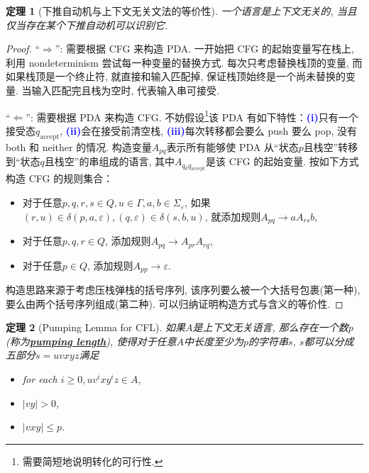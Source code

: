 \documentclass[8pt]{article}
\theoremstyle{compact}
\newtheorem{theorem}{定理}
\def\obj#1{\textbf{\uline{#1}}}
\def\num#1{\textnormal{\textbf{\mbox{\textcolor{blue}{(#1)}}}}}
\def\le{\leqslant}
\def\ge{\geqslant}
\begin{document}
\begin{theorem}[下推自动机与上下文无关文法的等价性]
	一个语言是上下文无关的, 当且仅当存在某个下推自动机可以识别它. 
\end{theorem}
\begin{proof}
	“$\Rightarrow$”: 需要根据 CFG 来构造 PDA. 一开始把 CFG 的起始变量写在栈上, 利用 nondeterminism 尝试每一种变量的替换方式. 每次只考虑替换栈顶的变量, 而如果栈顶是一个终止符, 就直接和输入匹配掉, 保证栈顶始终是一个尚未替换的变量. 当输入匹配完且栈为空时, 代表输入串可接受. 

	“$\Leftarrow$”: 需要根据 PDA 来构造 CFG. 不妨假设\footnote{需要简短地说明转化的可行性. }该 PDA 有如下特性：\num{i}只有一个接受态$q_{\text{accept}}$, \num{ii}会在接受前清空栈, \num{iii}每次转移都会要么 push 要么 pop, 没有 both 和 neither 的情况. 构造变量$A_{pq}$表示所有能够使 PDA 从“状态$p$且栈空”转移到“状态$q$且栈空”的串组成的语言, 其中$A_{q_0q_{\text{accept}}}$是该 CFG 的起始变量. 按如下方式构造 CFG 的规则集合：
	\begin{itemize}
		\item 对于任意$p, q, r, s \in Q, u \in \Gamma, a, b \in \Sigma_{\varepsilon}$, 如果$(r, u) \in \delta(p, a, \varepsilon), (q, \varepsilon) \in \delta(s, b, u)$, 就添加规则$A_{pq} \to a A_{rs} b$, 
		\item 对于任意$p, q, r \in Q$, 添加规则$A_{pq} \to A_{pr}A_{rq}$, 
		\item 对于任意$p \in Q$, 添加规则$A_{pp} \to \varepsilon$. 
	\end{itemize}

	构造思路来源于考虑压栈弹栈的括号序列, 该序列要么被一个大括号包裹(第一种), 要么由两个括号序列组成(第二种). 可以归纳证明构造方式与含义的等价性. 
\end{proof}
\begin{theorem}[Pumping Lemma for CFL]
	如果$A$是上下文无关语言, 那么存在一个数$p$(称为\obj{pumping length}), 使得对于任意$A$中长度至少为$p$的字符串$s$, $s$都可以分成五部分$s = uvxyz$满足
	\begin{itemize}
		\item for each $i \ge 0, uv^ixy^iz \in A$,
		\item $|vy| > 0$,
		\item $|vxy| \le p$.
	\end{itemize}
\end{theorem}
\end{document}

